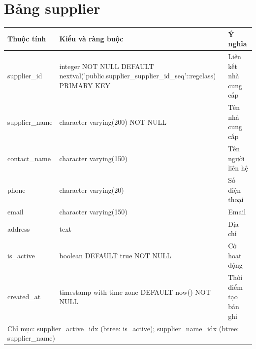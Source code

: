 \section{Bảng supplier}
\begin{longtable}{|p{}|p{}|p{}|}\hline
\textbf{Thuộc tính}&\textbf{Kiểu và ràng buộc}&\textbf{Ý nghĩa}\\\hline\endhead
supplier\_id & integer NOT NULL DEFAULT nextval('public.supplier\_supplier\_id\_seq'::regclass) PRIMARY KEY & Liên kết nhà cung cấp\\\hline
supplier\_name & character varying(200) NOT NULL & Tên nhà cung cấp\\\hline
contact\_name & character varying(150) & Tên người liên hệ\\\hline
phone & character varying(20) & Số điện thoại\\\hline
email & character varying(150) & Email\\\hline
address & text & Địa chỉ\\\hline
is\_active & boolean DEFAULT true NOT NULL & Cờ hoạt động\\\hline
created\_at & timestamp with time zone DEFAULT now() NOT NULL & Thời điểm tạo bản ghi\\\hline
\multicolumn{3}{|p{0.93\textwidth}|}{Chỉ mục: supplier\_active\_idx (btree: is\_active); supplier\_name\_idx (btree: supplier\_name)}\\\hline
\end{longtable}
\normalsize

